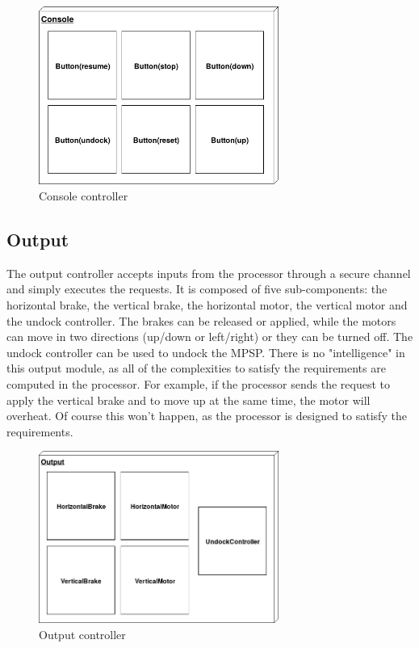 \begin{figure}[h]
    \centering
    \includegraphics[width=0.7\textwidth]{img/console.png}
    \caption{Console controller}
\end{figure}

\subsection{Output}

The output controller accepts inputs from the processor through a secure channel
and simply executes the requests.
It is composed of five sub-components: the horizontal brake, the vertical brake,
the horizontal motor, the vertical motor and the undock controller.
The brakes can be released or applied, while the motors can move in two directions
(up/down or left/right) or they can be turned off.
The undock controller can be used to
undock the MPSP.
There is no "intelligence" in this output module, as all of the complexities to satisfy
the requirements are computed in the processor.
For example, if the processor sends the request to apply the vertical brake and
to move up at the same time, the motor will overheat.
Of course this won't happen, as the processor is designed to satisfy the requirements.

\begin{figure}[h]
    \centering
    \includegraphics[width=0.7\textwidth]{img/output.png}
    \caption{Output controller}
\end{figure}

